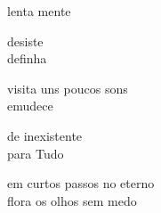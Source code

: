 lenta mente

desiste\\
definha

visita uns poucos sons\\
emudece

de inexistente\\
para Tudo

em curtos passos no eterno\\
flora os olhos sem medo
